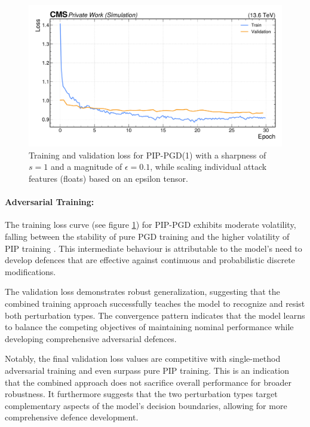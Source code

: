 \begin{figure}[H]
\centering
    \includegraphics[width=15cm]{media/output/combined_loss_validation.pdf}
    \caption{Training and validation loss for PIP-PGD(1) with a sharpness of $s=1$ and a magnitude of $\epsilon=0.1$, while scaling individual attack features (floats) based on an epsilon tensor.}
    \label{fig:combined_training_loss}
\end{figure}


\FloatBarrier
\paragraph{Adversarial Training:} The training loss curve (see figure \ref{fig:combined_training_loss}) for PIP-PGD exhibits moderate volatility, falling between the stability of pure PGD training and the higher volatility of PIP training . This intermediate behaviour is attributable to the model's need to develop defences that are effective against continuous and probabilistic discrete modifications.



The validation loss demonstrates robust generalization, suggesting that the combined training approach successfully teaches the model to recognize and resist both perturbation types. The convergence pattern indicates that the model learns to balance the competing objectives of maintaining nominal performance while developing comprehensive adversarial defences.

Notably, the final validation loss values are competitive with single-method adversarial training and even surpass pure PIP training. This is an indication that the combined approach does not sacrifice overall performance for broader robustness. It furthermore suggests that the two perturbation types target complementary aspects of the model's decision boundaries, allowing for more comprehensive defence development.

